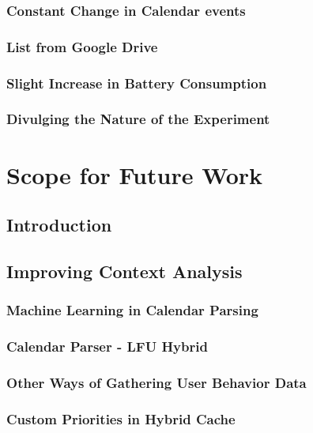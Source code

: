 \documentclass[12pt]{uthesis-v12}  %
\begin{document}
		\subsection{Constant Change in Calendar events}
		
		\subsection{List from Google Drive}
		
		\subsection{Slight Increase in Battery Consumption}
		
		\subsection{Divulging the Nature of the Experiment}
		
\chapter{Scope for Future Work}
		
	\section{Introduction}
		
	\section{Improving Context Analysis}
		
		\subsection{Machine Learning in Calendar Parsing}
		
		\subsection{Calendar Parser - LFU Hybrid}
		
		\subsection{Other Ways of Gathering User Behavior Data}
		
		\subsection{Custom Priorities in Hybrid Cache}
			
\end{document}
